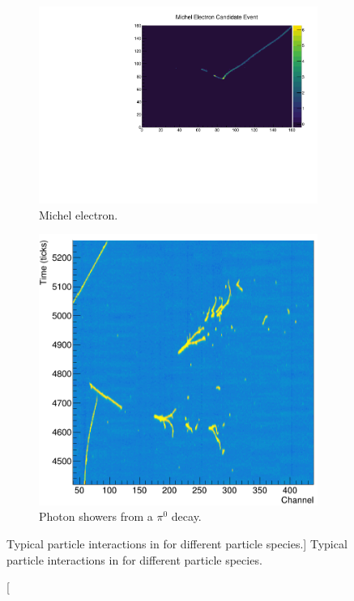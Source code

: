 \begin{figure}
	\begin{subfigure}[b]{0.49\textwidth}
		\centering
		\includegraphics[width=\textwidth]{figures/michel_candidate.pdf}
		\caption{Michel electron.}
		\label{fig:michel_signature}
	\end{subfigure}
	\hfill
	\begin{subfigure}[b]{0.49\textwidth}
		\centering
		\includegraphics[width=\textwidth]{figures/pi0_signature.png}
		\caption{Photon showers from a $\pi^0$ decay.}
		\label{fig:pi0_signature}
	\end{subfigure}

	\caption
	[Typical particle interactions in \protodune{} for different particle species.]
	{Typical particle interactions in \protodune{} for different particle species.}

	\label{fig:particle_signatures}

\end{figure}

